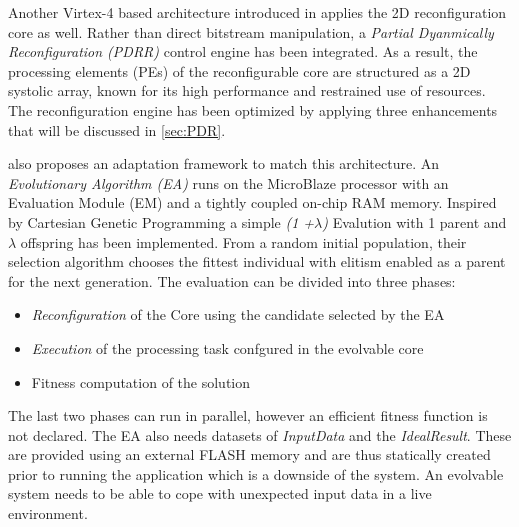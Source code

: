 
Another Virtex-4 based architecture introduced in \cite{PDR} applies the 2D reconfiguration core as well. Rather than direct bitstream manipulation, a \emph{Partial Dyanmically Reconfiguration (PDRR)} control engine has been integrated. As a result, the processing elements (PEs) of the reconfigurable core are structured as a 2D systolic array, known for its high performance and restrained use of resources. The reconfiguration engine has been optimized by applying three enhancements that will be discussed in \ref{sec:PDR}. 

\cite{PDR} also proposes an adaptation framework to match this architecture. An \emph{Evolutionary Algorithm (EA)} runs on the MicroBlaze processor with an Evaluation Module (EM) and a tightly coupled on-chip RAM memory.  Inspired by Cartesian Genetic Programming a simple \emph{(1 +$\lambda$)} Evalution with 1 parent and $\lambda$ offspring has been implemented. From a random initial population, their selection algorithm chooses the fittest individual with elitism enabled as a parent for the next generation. The evaluation can be divided into three phases:

\begin{itemize}
	\item \emph{Reconfiguration} of the Core using the candidate selected by the EA
	\item \emph{Execution} of the processing task confgured in the evolvable core
	\item {Fitness} computation of the solution
\end{itemize}

The last two phases can run in parallel, however an efficient fitness function is not declared. The EA also needs datasets of \emph{InputData} and the \emph{IdealResult}. These are provided using an external FLASH memory and are thus statically created prior to running the application which is a downside of the system. An evolvable system needs to be able to cope with unexpected input data in a live environment.